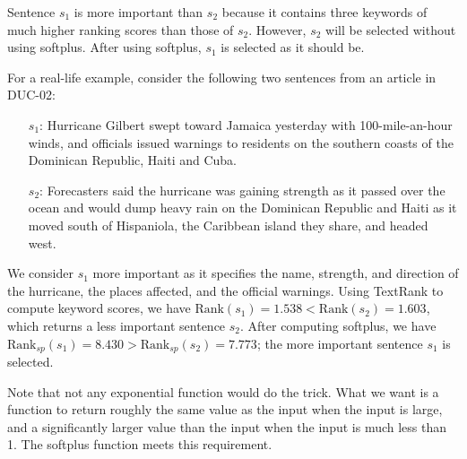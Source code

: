\documentclass[a4paper,twoside]{article}
\begin{document}
\medskip
Sentence $s_1$ is more important than $s_2$
because it contains three keywords of much higher ranking scores than those of $s_2$.
However, $s_2$ will be selected without using softplus. After using softplus, $s_1$ is selected as it should be.

\begin{comment}
For example, Hurricane Gilbert is heading toward Jamaica with 100 mph winds.
����1��(0.7, 0.6, 0.01, 0.02, 0.03)
softplus:(1.10318604889, 1.03748795049, 0.698159680508, 0.703197179727, 0.708259676341)
softplusֵ�ĺͣ�4.25029053595
Ȩ�غͣ�1.36


A hurricane warning has been issued for the island.
����2��(0.2, 0.2, 0.3, 0.3, 0.4)
softplus:(0.798138869382, 0.798138869382, 0.854355244469, 0.854355244469, 0.9130152524)
softplusֵ�ĺͣ�4.2180034801
Ȩ�غͣ�1.4
\end{comment}

For a real-life example, consider the following two sentences from an article in DUC-02:
\vspace*{-1pt}
\begin{itemize}
\item[$s_1$:] {\small\sf Hurricane Gilbert swept toward Jamaica yesterday with 100-mile-an-hour winds, and officials issued warnings to residents on the southern coasts of the Dominican Republic, Haiti and Cuba.}
\vspace*{-1pt}\item[$s_2$:] {\small\sf Forecasters said the hurricane was gaining strength as it passed over the ocean and would dump heavy rain on the Dominican Republic and Haiti as it moved south of Hispaniola, the Caribbean island they share, and headed west.}
\end{itemize}
We consider $s_1$ more important as it
specifies the name, strength, and direction of the hurricane, the places affected, and the official warnings.
Using TextRank to compute
keyword scores, we have $\mbox{Rank}(s_1) = 1.538 < \mbox{Rank}(s_2) = 1.603$, which returns a less important sentence $s_2$. After computing
softplus,
we have $\mbox{Rank}_{sp}(s_1) = 8.430 > \mbox{Rank}_{sp}(s_2) = 7.773$; the more important sentence $s_1$ is selected.

Note that not any exponential function would do the trick. What we want is a function to return roughly the same value as the input when the input is large, and a significantly larger value than the input when the input is much less than 1. The softplus function meets this requirement.
\end{document}
